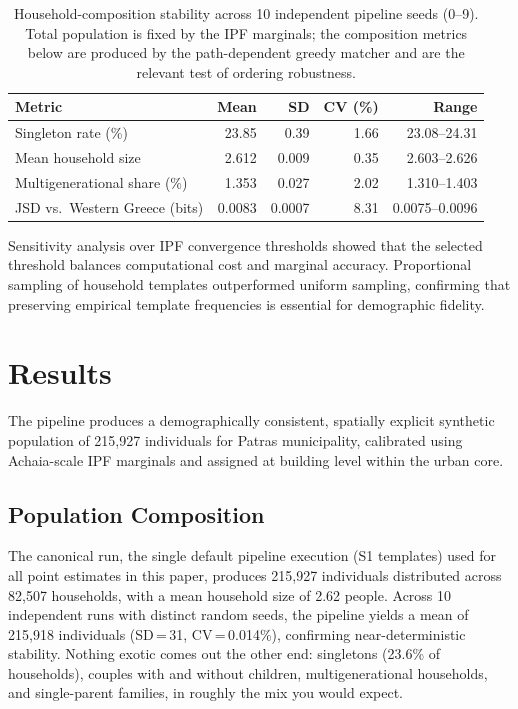 \documentclass{article}
\begin{document}
\begin{table}[htbp]
\centering
\small
\caption{Household-composition stability across 10 independent pipeline seeds (0--9). Total population is fixed by the IPF marginals; the composition metrics below are produced by the path-dependent greedy matcher and are the relevant test of ordering robustness.}
\label{tab:hh_stability}
\begin{tabular}{lrrrr}
\toprule
Metric & Mean & SD & CV (\%) & Range \\
\midrule
Singleton rate (\%)          & 23.85  & 0.39   & 1.66 & 23.08--24.31 \\
Mean household size          & 2.612  & 0.009  & 0.35 & 2.603--2.626 \\
Multigenerational share (\%) & 1.353  & 0.027  & 2.02 & 1.310--1.403 \\
JSD vs.\ Western Greece (bits) & 0.0083 & 0.0007 & 8.31 & 0.0075--0.0096 \\
\bottomrule
\end{tabular}
\end{table}

Sensitivity analysis over IPF convergence thresholds showed that the selected threshold balances computational cost and marginal accuracy. Proportional sampling of household templates outperformed uniform sampling, confirming that preserving empirical template frequencies is essential for demographic fidelity.

\section{Results}\label{results}

The pipeline produces a demographically consistent, spatially explicit synthetic population of 215,927 individuals for Patras municipality, calibrated using Achaia-scale IPF marginals and assigned at building level within the urban core.

\subsection{Population Composition}\label{population-composition}

The canonical run, the single default pipeline execution (S1 templates) used for all point estimates in this paper, produces 215,927 individuals distributed across 82,507 households, with a mean household size of 2.62 people. Across 10 independent runs with distinct random seeds, the pipeline yields a mean of 215,918 individuals (SD\,=\,31, CV\,=\,0.014\%), confirming near-deterministic stability. Nothing exotic comes out the other end: singletons (23.6\% of households), couples with and without children, multigenerational households, and single-parent families, in roughly the mix you would expect.
\end{document}
